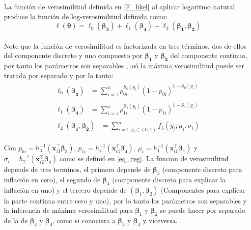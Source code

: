 La funci\'{o}n de verosimilitud definida en \eqref{F_likel} al aplicar logaritmo natural produce la funci\'{o}n de log-verosimilitud definida como:
\[
\ell(\boldsymbol{\theta})=\ell_0(\boldsymbol{\beta_3})+\ell_1(\boldsymbol{\beta_4})+\ell_2(\boldsymbol{\beta_1},\boldsymbol{\beta_2})
\]
\\
Note que la funci\'{o}n de verosimilitud es factorizada en tres t\'{e}rminos, dos de ellos del componente discreto y uno compuesto por $\boldsymbol{\beta_1}$ y $\boldsymbol{\beta_2}$ del componente continuo, por tanto los par\'{a}metros son separables \citep{Pace1}, as\'{\i} la m\'{a}xima verosimilitud puede ser tratada por separado y por lo tanto:\\
\begin{align*}
\begin{split}
	\ell_0(\boldsymbol{\beta_3}) &= \sum_{i=1}^{n}{p_{0i}^{S_0(y_i)}(1-p_{0i})^{1-S_0(y_i)}}
\end{split}\\
\begin{split}
	\ell_1(\boldsymbol{\beta_4}) &= \sum_{i=1}^{n}{p_{1i}^{S_1(y_i)}(1-p_{1i})^{1-S_1(y_i)}}
\end{split}\\
\begin{split}
	\ell_2(\boldsymbol{\beta_1},\boldsymbol{\beta_2}) &= \sum_{i=1:y_i \in (0,1)}^{n}{f_3(y_i;\mu_i,\sigma_i)} 
\end{split}
\end{align*}

Con $p_{0i}=h_3^{-1}(\mathbf{x}_{i3}^{\top} \boldsymbol{\beta}_3)$, $p_{1i}=h_4^{-1}(\mathbf{x}_{i4}^{\top} \boldsymbol{\beta}_4)$, $\mu_i=h_1^{-1}(\mathbf{x}_{i1}^{\top} \boldsymbol{\beta}_1)$ y $\sigma_i=h_2^{-1}(\mathbf{x}_{i2}^{\top} \boldsymbol{\beta}_2)$ como se defini\'{o} en \eqref{eq_reg}. La funcion de verosimilitud depende de tres terminos, el primero depende de $\boldsymbol{\beta}_3$ (componente discreto para inflaci\'{o}n en cero), el segundo de $\boldsymbol{\beta}_4$ (componente discreto para explicar la inflaci\'{o}n en uno) y el tercero depende de $(\boldsymbol{\beta}_1,\boldsymbol{\beta}_2)$ (Componentes para explicar la parte continua entre cero y uno), por lo tanto los par\'{a}metros son separables y la inferencia de m\'{a}xima verosimilitud para $\boldsymbol{\beta}_1$ y $\boldsymbol{\beta}_2$ se puede hacer por separado de la de $\boldsymbol{\beta}_3$ y $\boldsymbol{\beta}_4$, como si conociera a $\boldsymbol{\beta}_3$ y $\boldsymbol{\beta}_4$ y viceversa. \citep{Ospina1}.\\

